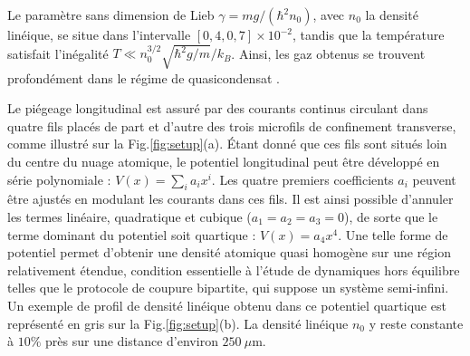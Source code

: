 






Le paramètre sans dimension de Lieb $\gamma = m g / (\hbar^2 n_0)$, avec $n_0$ la densité linéique, se situe dans l’intervalle $[0{,}4,0{,}7] \times 10^{-2}$, tandis que la température satisfait l’inégalité $T \ll n_0^{3/2} \sqrt{\hbar^2 g / m} / k_B$. Ainsi, les gaz obtenus se trouvent profondément dans le régime de quasicondensat \cite{PhysRevLett.91.040403}.

Le piégeage longitudinal est assuré par des courants continus circulant dans quatre fils placés de part et d’autre des trois microfils de confinement transverse, comme illustré sur la Fig.\ref{fig:setup}(a). Étant donné que ces fils sont situés loin du centre du nuage atomique, le potentiel longitudinal peut être développé en série polynomiale : $V(x) = \sum_i a_i x^i$. Les quatre premiers coefficients $a_i$ peuvent être ajustés en modulant les courants dans ces fils. Il est ainsi possible d’annuler les termes linéaire, quadratique et cubique ($a_1 = a_2 = a_3 = 0$), de sorte que le terme dominant du potentiel soit quartique : $V(x) = a_4 x^4$. Une telle forme de potentiel permet d’obtenir une densité atomique quasi homogène sur une région relativement étendue, condition essentielle à l’étude de dynamiques hors équilibre telles que le protocole de coupure bipartite, qui suppose un système semi-infini. Un exemple de profil de densité linéique obtenu dans ce potentiel quartique est représenté en gris sur la Fig.\ref{fig:setup}(b). La densité linéique $n_0$ y reste constante à $10\%$ près sur une distance d’environ $250~\mu$m.


